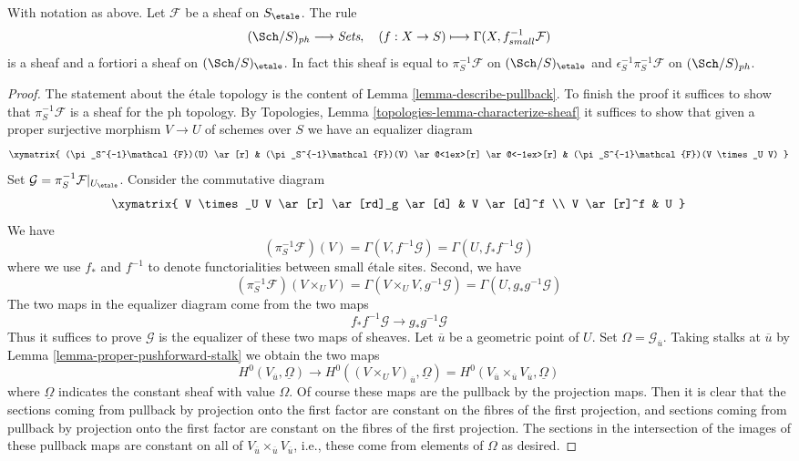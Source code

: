 \begin{lemma}
\label{lemma-describe-pullback-pi-ph}
With notation as above.
Let $\mathcal{F}$ be a sheaf on $S_\etale$. The rule
$$
(\Sch/S)_{ph} \longrightarrow \textit{Sets},\quad
(f : X \to S) \longmapsto \Gamma(X, f_{small}^{-1}\mathcal{F})
$$
is a sheaf and a fortiori a sheaf on $(\Sch/S)_\etale$.
In fact this sheaf is equal to
$\pi_S^{-1}\mathcal{F}$ on $(\Sch/S)_\etale$ and
$\epsilon_S^{-1}\pi_S^{-1}\mathcal{F}$ on $(\Sch/S)_{ph}$.
\end{lemma}

\begin{proof}
The statement about the \'etale topology is the content
of Lemma \ref{lemma-describe-pullback}. To finish the proof it
suffices to show that $\pi_S^{-1}\mathcal{F}$ is a sheaf for the ph
topology. By Topologies, Lemma \ref{topologies-lemma-characterize-sheaf}
it suffices to show that given a proper surjective morphism
$V \to U$ of schemes over $S$ we have an equalizer diagram
$$
\xymatrix{
(\pi_S^{-1}\mathcal{F})(U) \ar[r] &
(\pi_S^{-1}\mathcal{F})(V) \ar@<1ex>[r] \ar@<-1ex>[r] &
(\pi_S^{-1}\mathcal{F})(V \times_U V)
}
$$
Set $\mathcal{G} = \pi_S^{-1}\mathcal{F}|_{U_\etale}$.
Consider the commutative diagram
$$
\xymatrix{
V \times_U V \ar[r] \ar[rd]_g \ar[d] & V \ar[d]^f \\
V \ar[r]^f & U
}
$$
We have
$$
(\pi_S^{-1}\mathcal{F})(V) = \Gamma(V, f^{-1}\mathcal{G}) =
\Gamma(U, f_*f^{-1}\mathcal{G})
$$
where we use $f_*$ and $f^{-1}$ to denote functorialities between
small \'etale sites. Second, we have
$$
(\pi_S^{-1}\mathcal{F})(V \times_U V) =
\Gamma(V \times_U V, g^{-1}\mathcal{G}) =
\Gamma(U, g_*g^{-1}\mathcal{G})
$$
The two maps in the equalizer diagram come from the two maps
$$
f_*f^{-1}\mathcal{G} \longrightarrow g_*g^{-1}\mathcal{G}
$$
Thus it suffices to prove $\mathcal{G}$ is
the equalizer of these two maps of sheaves.
Let $\overline{u}$ be a geometric point of $U$. Set
$\Omega = \mathcal{G}_{\overline{u}}$.
Taking stalks at $\overline{u}$ by
Lemma \ref{lemma-proper-pushforward-stalk}
we obtain the two maps
$$
H^0(V_{\overline{u}}, \underline{\Omega}) \longrightarrow
H^0((V \times_U V)_{\overline{u}}, \underline{\Omega}) =
H^0(V_{\overline{u}} \times_{\overline{u}} V_{\overline{u}},
\underline{\Omega})
$$
where $\underline{\Omega}$ indicates the constant sheaf with value
$\Omega$. Of course these maps are the pullback by the projection maps.
Then it is clear that the sections coming from pullback
by projection onto the first factor are constant on the fibres of
the first projection, and sections coming from pullback
by projection onto the first factor are constant on the fibres of
the first projection. The sections in the intersection of the images
of these pullback maps are constant on all of
$V_{\overline{u}} \times_{\overline{u}} V_{\overline{u}}$, i.e.,
these come from elements of $\Omega$ as desired.
\end{proof}

